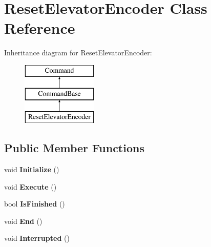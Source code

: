 \hypertarget{class_reset_elevator_encoder}{}\section{Reset\+Elevator\+Encoder Class Reference}
\label{class_reset_elevator_encoder}
Inheritance diagram for Reset\+Elevator\+Encoder\+:\begin{figure}[H]
\begin{center}
\leavevmode
\includegraphics[height=3.000000cm]{class_reset_elevator_encoder}
\end{center}
\end{figure}
\subsection*{Public Member Functions}
\begin{DoxyCompactItemize}
\item 
\hypertarget{class_reset_elevator_encoder_a0e3a40d24f7a0a96f631599099164745}{}void {\bfseries Initialize} ()\label{class_reset_elevator_encoder_a0e3a40d24f7a0a96f631599099164745}

\item 
\hypertarget{class_reset_elevator_encoder_a924742c61f49ffa9b1d2c2706e994091}{}void {\bfseries Execute} ()\label{class_reset_elevator_encoder_a924742c61f49ffa9b1d2c2706e994091}

\item 
\hypertarget{class_reset_elevator_encoder_af47be14b74b7d8c1fd339e6e36ebd127}{}bool {\bfseries Is\+Finished} ()\label{class_reset_elevator_encoder_af47be14b74b7d8c1fd339e6e36ebd127}

\item 
\hypertarget{class_reset_elevator_encoder_af256e1346b89aad463aeb591a40226f3}{}void {\bfseries End} ()\label{class_reset_elevator_encoder_af256e1346b89aad463aeb591a40226f3}

\item 
\hypertarget{class_reset_elevator_encoder_a6ffbbbeffbb11266d7ac68bf26877794}{}void {\bfseries Interrupted} ()\label{class_reset_elevator_encoder_a6ffbbbeffbb11266d7ac68bf26877794}

\end{DoxyCompactItemize}
